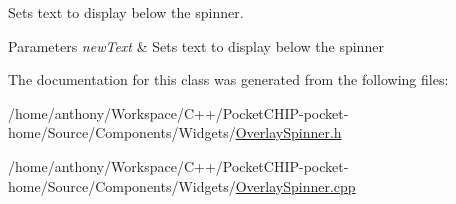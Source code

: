 Sets text to display below the spinner.


\begin{DoxyParams}{Parameters}
{\em new\+Text} & Sets text to display below the spinner \\
\hline
\end{DoxyParams}


The documentation for this class was generated from the following files\+:\begin{DoxyCompactItemize}
\item 
/home/anthony/\+Workspace/\+C++/\+Pocket\+C\+H\+I\+P-\/pocket-\/home/\+Source/\+Components/\+Widgets/\mbox{\hyperlink{OverlaySpinner_8h}{Overlay\+Spinner.\+h}}\item 
/home/anthony/\+Workspace/\+C++/\+Pocket\+C\+H\+I\+P-\/pocket-\/home/\+Source/\+Components/\+Widgets/\mbox{\hyperlink{OverlaySpinner_8cpp}{Overlay\+Spinner.\+cpp}}\end{DoxyCompactItemize}
